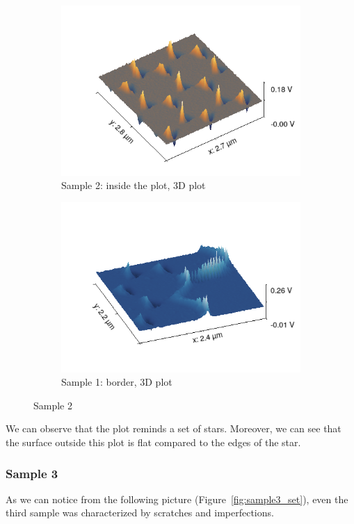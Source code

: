 \documentclass[11pt,a4paper]{article}
\begin{document}
\begin{figure}[H]
\begin{subfigure}[b]{0.45\textwidth}
\includegraphics[width=\textwidth]{sm_sample2_3D}
\caption{Sample 2: inside the plot, 3D plot}
\label{fig:}
\end{subfigure}
\begin{subfigure}[b]{0.45\textwidth}
\includegraphics[width=\textwidth]{sm_sample2_border_3D}
\caption{Sample 1: border, 3D plot}
\label{fig:}
\end{subfigure}
\caption{Sample 2}
\end{figure}

We can observe that the plot reminds a set of stars. Moreover, we can see that the surface outside this plot is flat compared to the edges of the star.

\subsubsection{Sample 3}
As we can notice from the following picture (Figure~\ref{fig:sample3_set}), even the third sample was characterized by scratches and imperfections.
\end{document}
